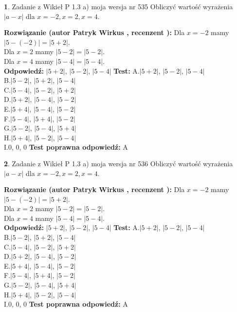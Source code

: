 \documentclass[12pt, a4paper]{article}
\theoremstyle{definition} %
\newtheorem{zad}{}
\newcommand{\zadStart}[1]{\begin{zad}#1\newline}
\newcommand{\zadStop}{\end{zad}}
\newcommand{\rozwStart}[2]{\noindent \textbf{Rozwiązanie (autor #1 , recenzent #2): }\newline}
\newcommand{\rozwStop}{\newline}
\newcommand{\odpStart}{\noindent \textbf{Odpowiedź:}\newline}
\newcommand{\odpStop}{\newline}
\newcommand{\testStart}{\noindent \textbf{Test:}\newline}
\newcommand{\testStop}{\newline}
\newcommand{\kluczStart}{\noindent \textbf{Test poprawna odpowiedź:}\newline}
\newcommand{\kluczStop}{\newline}
\begin{document}
\zadStart{Zadanie z Wikieł P 1.3 a) moja wersja nr 535}
Obliczyć wartość wyrażenia $|a - x|$ dla $x=-2,x=2,x=4$.
\zadStop
\rozwStart{Patryk Wirkus}{}
Dla $x = -2$ mamy $|5 - (-2)| = |5 + 2|$.\\
Dla $x = 2$ mamy $|5 - 2| = |5 - 2|$.\\
Dla $x = 4$ mamy $|5 - 4| = |5 - 4|$.\\
\rozwStop
\odpStart
$|5 + 2|$, $|5 - 2|$, $|5 - 4|$
\odpStop
\testStart
A.$|5 + 2|$, $|5 - 2|$, $|5 - 4|$\\
B.$|5 - 2|$, $|5 + 2|$, $|5 - 4|$\\
C.$|5 - 4|$, $|5 - 2|$, $|5 + 2|$\\
D.$|5 + 2|$, $|5 - 4|$, $|5 - 2|$\\
E.$|5 + 4|$, $|5 - 4|$, $|5 - 2|$\\
F.$|5 - 4|$, $|5 + 4|$, $|5 - 2|$\\
G.$|5 - 2|$, $|5 - 4|$, $|5 + 4|$\\
H.$|5 + 4|$, $|5 - 2|$, $|5 - 4|$\\
I.$0$, $0$, $0$
\testStop
\kluczStart
A
\kluczStop



\zadStart{Zadanie z Wikieł P 1.3 a) moja wersja nr 536}
Obliczyć wartość wyrażenia $|a - x|$ dla $x=-2,x=2,x=4$.
\zadStop
\rozwStart{Patryk Wirkus}{}
Dla $x = -2$ mamy $|5 - (-2)| = |5 + 2|$.\\
Dla $x = 2$ mamy $|5 - 2| = |5 - 2|$.\\
Dla $x = 4$ mamy $|5 - 4| = |5 - 4|$.\\
\rozwStop
\odpStart
$|5 + 2|$, $|5 - 2|$, $|5 - 4|$
\odpStop
\testStart
A.$|5 + 2|$, $|5 - 2|$, $|5 - 4|$\\
B.$|5 - 2|$, $|5 + 2|$, $|5 - 4|$\\
C.$|5 - 4|$, $|5 - 2|$, $|5 + 2|$\\
D.$|5 + 2|$, $|5 - 4|$, $|5 - 2|$\\
E.$|5 + 4|$, $|5 - 4|$, $|5 - 2|$\\
F.$|5 - 4|$, $|5 + 4|$, $|5 - 2|$\\
G.$|5 - 2|$, $|5 - 4|$, $|5 + 4|$\\
H.$|5 + 4|$, $|5 - 2|$, $|5 - 4|$\\
I.$0$, $0$, $0$
\testStop
\kluczStart
A
\kluczStop
\end{document}

